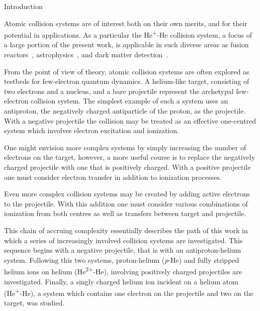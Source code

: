 \documentclass[letterpaper, 11 pt]{report}
\begin{document}
\singlespacing

\setcounter{page}{3}

\cleardoublepage
{}
{}
\tableofcontents

\cleardoublepage
{}
{}
\listoftables

\cleardoublepage
{}
{}
\listoffigures

\newpage


\onehalfspacing  %

\begin{chapter}{Introduction \label{chap:intro}}

   Atomic collision systems are of interest both on their own merits, and for their potential in
   applications. As a  particular the He\textsuperscript{+}-He collision system, a focus of a large
   portion of the present work, is applicable in such diverse areas as fusion reactors~\cite{fusion1,
   fusion2}, astrophysics~\cite{astro1, astro2}, and dark matter detection~\cite{dmdet}.

   From the point of view of theory, atomic collision systems are often explored as testbeds for
   few-electron quantum dynamics. A helium-like target, consisting of two electrons and a nucleus, and a
   bare projectile represent the archetypal few-electron collision system. The simplest example of such
   a system uses an antiproton, the negatively charged antiparticle of the proton, as the projectile.
   With a negative projectile the collision may be treated as an effective one-centred system which
   involves electron excitation and ionization.

   One might envision more complex systems by simply increasing the number of electrons on the target,
   however, a more useful course is to replace the negatively charged projectile with one that is
   positively charged. With a positive projectile one must consider electron transfer in addition to
   ionization processes.

   Even more complex collision systems may be created by adding active electrons to the projectile. With
   this addition one must consider various combinations of ionization from both centres as well as
   transfers between target and projectile.

   This chain of accruing complexity essentially describes the path of this work in which a series of
   increasingly involved collision systems are investigated. This sequence begins with a negative
   projectile, that is with an antiproton-helium system. Following this two systems, proton-helium
   (\textit{p}-He) and fully stripped helium ions on helium (He\textsuperscript{2+}-He), involving
   positively charged projectiles are investigated. Finally, a singly charged helium ion incident on
   a helium atom (He\textsuperscript{+}-He), a system which contains one electron on the projectile and
   two on the target, was studied.


\end{chapter}
\end{document}
